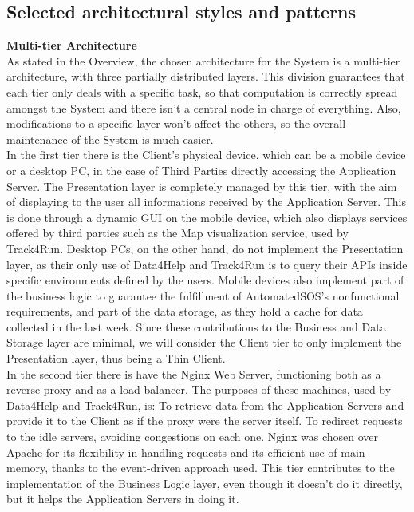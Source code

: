\documentclass[titlepage]{article}
\begin{document}
\pagebreak



\subsection{Selected architectural styles and patterns}

{\bf Multi-tier Architecture }\\ 
As stated in the Overview, the chosen architecture for the System is a multi-tier architecture, with three partially distributed layers. This division guarantees that each tier only deals with a specific task, so that computation is correctly spread amongst the System and there isn’t a central node in charge of everything. Also, modifications to a specific layer won’t affect the others, so the overall maintenance of the System is much easier.\\

In the first tier there is the Client’s physical device, which can be a mobile device or a desktop PC, in the case of Third Parties directly accessing the Application Server.
The Presentation layer is completely managed by this tier, with the aim of displaying to the user all informations received by the Application Server. This is done through a dynamic GUI on the mobile device, which also displays services offered by third parties such as the Map visualization service, used by Track4Run. Desktop PCs, on the other hand, do not implement the Presentation layer, as their only use of Data4Help and Track4Run is to query their APIs inside specific environments defined by the users.
Mobile devices also implement part of the business logic to guarantee the fulfillment of AutomatedSOS's nonfunctional requirements, and part of the data storage, as they hold a cache for data collected in the last week. Since these contributions to the Business and Data Storage layer are minimal, we will consider the Client tier to only implement the Presentation layer, thus being a Thin Client.\\

In the second tier there is have the Nginx Web Server, functioning both as a reverse proxy and as a load balancer. The purposes of these machines, used by Data4Help and Track4Run, is:
To retrieve data from the Application Servers and provide it to the Client as if the proxy were the server itself.
To redirect requests to the idle servers, avoiding congestions on each one.
Nginx was chosen over Apache for its flexibility in handling requests and its efficient use of main memory, thanks to the event-driven approach used.
This tier contributes to the implementation of the Business Logic layer, even though it doesn’t do it directly, but it helps the Application Servers in doing it.\\
\end{document}
